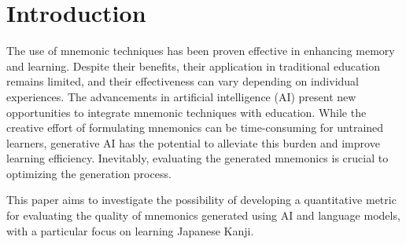 \section{Introduction} \label{sec:body_motivation}

The use of mnemonic techniques has been proven effective in enhancing memory and learning. Despite their benefits, their application in traditional education remains limited, and their effectiveness can vary depending on individual experiences. The advancements in artificial intelligence (AI) present new opportunities to integrate mnemonic techniques with education. While the creative effort of formulating mnemonics can be time-consuming for untrained learners, generative AI has the potential to alleviate this burden and improve learning efficiency. Inevitably, evaluating the generated mnemonics is crucial to optimizing the generation process.

This paper aims to investigate the possibility of developing a quantitative metric for evaluating the quality of mnemonics generated using AI and language models, with a particular focus on learning Japanese Kanji.

